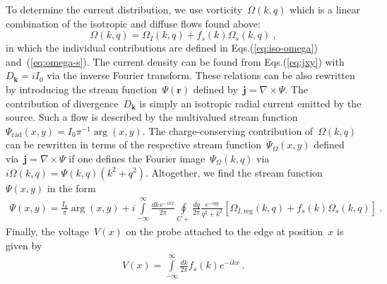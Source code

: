 \documentclass[preprint,aps,eqsecnum, prb]{revtex4-1}
\begin{document}
To determine the current distribution, we use vorticity~$\Omega(k, q)$
which is a linear combination of the isotropic and diffuse flows found
above:
\begin{equation}
  \Omega(k, q) = \Omega_{I}(k, q) + f_{s}(k) \Omega_{s}(k, q)
\ ,
\end{equation}
in which the individual contributions are defined in Eqs.(\ref{eq:iso-omega})
and~(\ref{eq:omega-s}). The current density can be found
from Eqs.(\ref{eq:jxy}) with~$D_{\bm k} = i I_0$
via the inverse Fourier transform. These relations
can be also rewritten by introducing the stream function~$\Psi({\bm r})$
defined by~${\bm j} = \nabla \times \Psi$. The
contribution of divergence~$D_{\bm k}$ is simply an isotropic
radial current emitted by the source. Such a flow is described
by the multivalued stream
function~$\Psi_\mathrm{rad}(x, y) = I_0 \pi^{-1}\arg(x, y)$.
The charge-conserving
contribution of~$\Omega(k, q)$ can be rewritten in terms of
the respective stream function~$\Psi_\Omega(x, y)$
defined via~${\bm j} = \nabla \times \Psi$ if one defines
the Fourier image~$\Psi_\Omega(k, q)$ via
$i\Omega(k, q) = \Psi(k, q)(k^2 + q^2)$. Altogether, we find
the stream function~$\Psi(x, y)$ in the form
\begin{align}
\label{eq:psi-final}
  \Psi(x, y) = \frac{I_0}{\pi} \arg(x, y)
  + i\int\limits_{-\infty}^{\infty} \frac{dk\, e^{-ikx}}{2\pi}
  \oint\limits_{C+} \frac{dq}{2\pi} \frac{e^{-iqy}}{q^2 + k^2}
  \left[\Omega_{I, \mathrm{reg}}(k, q)
  + f_s(k) \Omega_{s}(k, q) \right]\ .
\end{align}
Finally, the voltage~$V(x)$ on the probe attached to the edge at position~$x$
is given by
\begin{align}
  V(x) =  \int\limits_{-\infty}^{\infty} \frac{dk}{2\pi} f_s(k) e^{-ik x}
  \ .
\end{align}
\end{document}
